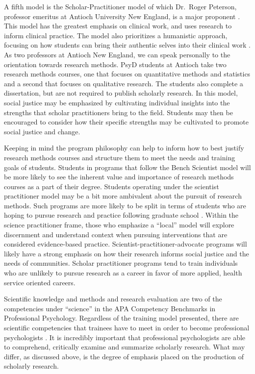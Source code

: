 \documentclass[
  11pt,
]{book}
\begin{document}
A fifth model is the Scholar-Practitioner model of which Dr.~Roger Peterson, professor emeritus at Antioch University New England, is a major proponent \citep{peterson_national_1997}. This model has the greatest emphasis on clinical work, and uses research to inform clinical practice. The model also prioritizes a humanistic approach, focusing on how students can bring their authentic selves into their clinical work \citep{deangelis_three_2003}. As two professors at Antioch New England, we can speak personally to the orientation towards research methods. PsyD students at Antioch take two research methods courses, one that focuses on quantitative methods and statistics and a second that focuses on qualitative research. The students also complete a dissertation, but are not required to publish scholarly research. In this model, social justice may be emphasized by cultivating individual insights into the strengths that scholar practitioners bring to the field. Students may then be encouraged to consider how their specific strengths may be cultivated to promote social justice and change.

Keeping in mind the program philosophy can help to inform how to best justify research methods courses and structure them to meet the needs and training goals of students. Students in programs that follow the Bench Scientist model will be more likely to see the inherent value and importance of research methods courses as a part of their degree. Students operating under the scientist practitioner model may be a bit more ambivalent about the pursuit of research methods. Such programs are more likely to be split in terms of students who are hoping to pursue research and practice following graduate school \citep{deangelis_three_2003}. Within the science practitioner frame, those who emphasize a ``local'' model will explore discernment and understand context when pursuing interventions that are considered evidence-based practice. Scientist-practitioner-advocate programs will likely have a strong emphasis on how their research informs social justice and the needs of communities. Scholar practitioner programs tend to train individuals who are unlikely to pursue research as a career in favor of more applied, health service oriented careers.

Scientific knowledge and methods and research evaluation are two of the competencies under ``science'' in the APA Competency Benchmarks in Professional Psychology. Regardless of the training model presented, there are scientific competencies that trainees have to meet in order to become professional psychologists . It is incredibly important that professional psychologists are able to comprehend, critically examine and summarize scholarly research. What may differ, as discussed above, is the degree of emphasis placed on the production of scholarly research.
\end{document}
